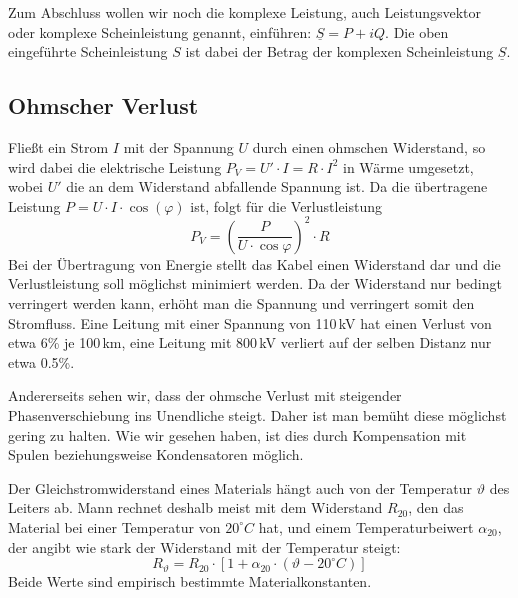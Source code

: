 Zum Abschluss wollen wir noch die komplexe Leistung, auch Leistungsvektor oder komplexe Scheinleistung genannt, einführen: $\underline{S} = P+i Q$. Die oben eingeführte Scheinleistung $S$ ist dabei der Betrag der komplexen Scheinleistung $\underline{S}$.

\subsection{Ohmscher Verlust}
Fließt ein Strom $I$ mit der Spannung $U$ durch einen ohmschen Widerstand, so wird dabei die elektrische Leistung
$P_V = U' \cdot I = R \cdot I^2$
in Wärme umgesetzt, wobei $U'$ die an dem Widerstand abfallende Spannung ist.
Da die übertragene Leistung $P=U \cdot I \cdot \cos(\varphi)$ ist, folgt für die Verlustleistung
\begin{equation}\label{eq:Verlust}
P_V = \left(\frac{P}{U \cdot \cos\varphi}\right)^2\cdot R
\end{equation}
Bei der Übertragung von Energie stellt das Kabel einen Widerstand dar und die Verlustleistung soll möglichst minimiert werden. Da der Widerstand nur bedingt verringert werden kann, erhöht man die Spannung und verringert somit den Stromfluss. Eine Leitung mit einer Spannung von 110\,kV hat einen Verlust von etwa 6\% je 100\,km, eine Leitung mit 800\,kV verliert auf der selben Distanz nur etwa 0.5\%.

Andererseits sehen wir, dass der ohmsche Verlust mit steigender Phasenverschiebung ins Unendliche steigt. Daher ist man bemüht diese möglichst gering zu halten. Wie wir gesehen haben, ist dies durch Kompensation mit Spulen beziehungsweise Kondensatoren möglich.

Der Gleichstromwiderstand eines Materials hängt auch von der Temperatur $\vartheta$ des Leiters ab. Mann rechnet deshalb meist mit dem Widerstand $R_{20}$, den das Material bei einer Temperatur von $20^\circ C$ hat, und einem Temperaturbeiwert $\alpha_{20}$, der angibt wie stark der Widerstand mit der Temperatur steigt:
\begin{equation}
R_\vartheta = R_{20} \cdot \left[ 1 + \alpha_{20} \cdot \left( \vartheta - 20^\circ C \right) \right]
\end{equation}
Beide Werte sind empirisch bestimmte Materialkonstanten.



